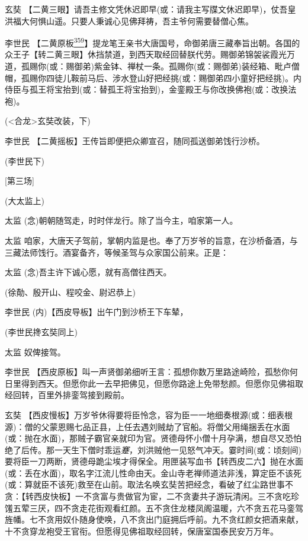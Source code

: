 玄奘
【二黄三眼】请吾主修文凭休迟即早(或：请我主写牒文休迟即早)，仗吾皇洪福大何惧山遥。只要人秉诚心见佛拜祷，吾主爷何需要替僧心焦。

李世民
【二黄原板\protect\hyperlink{fn359}{\textsuperscript{359}}】提龙笔王亲书大唐国号，命御弟唐三藏奉旨出朝。各国的众王子【转二黄三眼】休挡禁道，到西天取经回替朕代劳。赐御弟锦袈裟霞光万道，孤赐你(或：赐御弟)紫金钵、禅杖一条。孤赐你(或：赐御弟)装经箱、毗卢僧帽，孤赐你四徒儿鞍前马后、涉水登山好把经挑(或：赐御弟四小童好把经挑)。内侍臣与孤王将宝抬到(或：替孤王将宝抬到)，金銮殿王与你改换佛袍(或：改换法袍)。

(\textless{}合龙\textgreater{}玄奘改装，下)

李世民 【二黄摇板】王传旨即便把众卿宣召，随同孤送御弟饯行沙桥。

(李世民下)

{[}第三场{]}

(大太监上)

太监 (念)朝朝随驾走，时时伴龙行。除了当今主，咱家第一人。

太监
咱家，大唐天子驾前，掌朝内监是也。奉了万岁爷的旨意，在沙桥备酒，与三藏法师饯行。酒宴备齐，等候圣驾与众家国公前来。正是：

太监 (念)吾主许下诚心愿，就有高僧往西天。

(徐勣、殷开山、程咬金、尉迟恭上)

李世民 (内)【西皮导板】出午门到沙桥王下车辇，

(李世民搀玄奘同上)

太监 奴俾接驾。

李世民
【西皮原板】叫一声贤御弟细听王言：孤想你数万里路途崎险，孤愁你何日里得到西天。但愿你此一去早把佛见，但愿你路途上免带愁颜。但愿你见佛祖取经回转，百里外排銮驾接到殿前。

玄奘
【西皮慢板】万岁爷休得要将臣怜念，容为臣一一地细奏根源(或：细表根源)：僧的父蒙恩赐七品正县，上任去遇刘贼劫了官船。将僧父用绳捆丢在水面(或：抛在水面)，那贼子霸官亲就印为官。贤德母怀小僧十月孕满，想自尽又恐怕绝了后传。那一天生下僧时乖运\emph{蹇}，刘洪贼他一见怒气冲天。霎时间(或：顷刻间)要将臣一刀两断，贤德母跪尘埃才得保全。用匣装写血书【转西皮二六】抛在水面(或：丢在水面)，取名字江流儿性命由天。金山寺老禅师道法非浅，算定臣不该死(或：算就臣不该死)救至在山前。取法名唤玄奘苦把经念，看破了红尘路世事不贪：【转西皮快板】一不贪富与贵做官为宦，二不贪妻共子游玩清闲。三不贪吃珍馐五荤三厌，四不贪走花街观看红颜。五不贪住龙楼凤阁温暖，六不贪五花马銮驾旌幡。七不贪用奴仆随身使唤，八不贪出门庭拥后呼前。九不贪红颜女把酒来献，十不贪穿龙袍受王官衔。但愿得见佛祖取经回转，保唐室国泰民安万万年。

